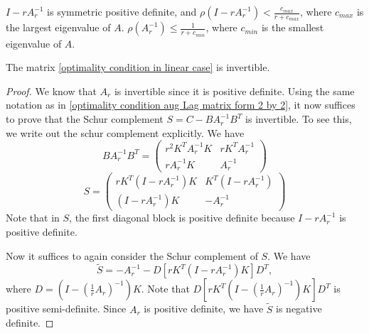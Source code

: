 \begin{lemma}
$I - rA_r^{-1}$ is symmetric positive definite, and $\rho(I - rA_r^{-1}) < \frac{c_{max}}{r + c_{max}}$, where $c_{max}$ is the largest eigenvalue of $A$. $\rho(A_r^{-1}) \leq \frac{1}{r + c_{min}}$, where $c_{min}$ is the smallest eigenvalue of $A$.
\end{lemma}

\begin{theorem}
The matrix \eqref{optimality condition in linear case} is invertible. 
\end{theorem}
\begin{proof}
We know that $A_r$ is invertible since it is positive definite. 
Using the same notation as in \eqref{optimality condition aug Lag matrix form 2 by 2}, it now suffices to prove that the Schur complement $S = C - B A_{r}^{-1} B^T$ is invertible. To see this, we write out the schur complement explicitly.
We have 
\begin{equation}
    B A_r^{-1} B^T = \begin{pmatrix}
    r^2 K^T A_r^{-1} K&  r K^T A_r^{-1}\\
    r A_r^{-1} K & A_r^{-1}
    \end{pmatrix}
\end{equation}
\begin{equation}
    S = \begin{pmatrix}
    r K^T \left(I - r A_{r}^{-1} \right)K  & K^T (I -  r A_{r}^{-1} ) \\
    (I -  r A_{r}^{-1} ) K  & - A_{r}^{-1}
    \end{pmatrix}
\end{equation}
Note that in $S$, the first diagonal block is positive definite because $I - r A_{r}^{-1}$ is positive definite. 

Now it suffices to again consider the Schur complement of $S$. We have 
\begin{equation}
    \tilde{S} = -A_r^{-1} - D \left[ r K^T \left(I -  r A_{r}^{-1} \right)K  \right] D^T  ,
\end{equation}
where $D = (I - (\frac{1}{r} A_r)^{-1}) K$.
Note that $D \left[ r K^T \left(I - (\frac{1}{r} A_{r})^{-1} \right)K  \right] D^T $ is positive semi-definite. Since $A_r$ is positive definite, we have $\tilde{S}$ is negative definite. 
\end{proof}

